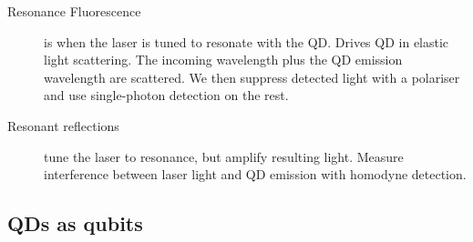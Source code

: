 \begin{description}
\item[Resonance Fluorescence] is when the laser is tuned to resonate with the QD. Drives QD in elastic light scattering. The incoming wavelength plus the QD emission wavelength are scattered. We then suppress detected light with a polariser and use single-photon detection on the rest. 

\item[Resonant reflections] tune the laser to resonance, but amplify resulting light. Measure interference between laser light and QD emission with homodyne detection. 


\end{description}

\subsection{QDs as qubits}
